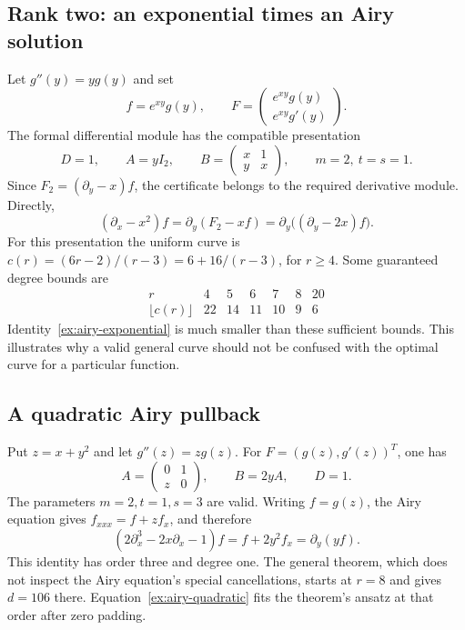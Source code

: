 \subsection{Rank two: an exponential times an Airy solution}
Let $g''(y)=yg(y)$ and set
\[
 f=e^{xy}g(y),\qquad
 F=\begin{pmatrix}e^{xy}g(y)\\e^{xy}g'(y)\end{pmatrix}.
\]
The formal differential module has the compatible presentation
\[
 D=1,\qquad A=yI_2,\qquad
 B=\begin{pmatrix}x&1\\y&x\end{pmatrix},
 \qquad m=2,\ t=s=1.
\]
Since $F_2=(\partial_y-x)f$, the certificate belongs to the required
derivative module. Directly,
\begin{equation}\label{ex:airy-exponential}
 (\partial_x-x^2)f
   =\partial_y(F_2-xf)
   =\partial_y\bigl((\partial_y-2x)f\bigr).
\end{equation}
For this presentation the uniform curve is
$c(r)=(6r-2)/(r-3)=6+16/(r-3)$, for $r\ge4$.
Some guaranteed degree bounds are
\[
\begin{array}{c|rrrrrr}
 r&4&5&6&7&8&20\\\hline
 \lfloor c(r)\rfloor&22&14&11&10&9&6
\end{array}
\]
Identity~\eqref{ex:airy-exponential} is much smaller than these sufficient
bounds. This illustrates why a valid general curve should not be
confused with the optimal curve for a particular function.

\subsection{A quadratic Airy pullback}
Put $z=x+y^2$ and let $g''(z)=zg(z)$. For
$F=(g(z),g'(z))^T$, one has
\[
 A=\begin{pmatrix}0&1\\z&0\end{pmatrix},\qquad
 B=2yA,\qquad D=1.
\]
The parameters $m=2,t=1,s=3$ are valid. Writing $f=g(z)$,
the Airy equation gives $f_{xxx}=f+zf_x$, and therefore
\begin{equation}\label{ex:airy-quadratic}
 (2\partial_x^3-2x\partial_x-1)f
 =f+2y^2f_x=\partial_y(yf).
\end{equation}
This identity has order three and degree one. The general theorem, which
does not inspect the Airy equation's special cancellations, starts at
$r=8$ and gives $d=106$ there. Equation~\eqref{ex:airy-quadratic}
fits the theorem's ansatz at that order after zero padding.

